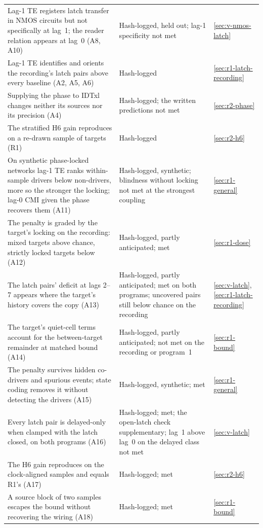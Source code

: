 {\begin{longtable}{@{}L{0.55\textwidth}L{0.28\textwidth}l@{}}
    Lag-1 TE registers latch transfer in NMOS circuits but not specifically at lag~1; the reader relation appears at lag~0 (A8, A10) & Hash-logged, held out; lag-1 specificity not met & \ref{sec:v-nmos-latch} \\
    Lag-1 TE identifies and orients the recording's latch pairs above every baseline (A2, A5, A6) & Hash-logged & \ref{sec:r1-latch-recording} \\
    Supplying the phase to IDTxl changes neither its sources nor its precision (A4) & Hash-logged; the written predictions not met & \ref{sec:r2-phase} \\
    The stratified H6 gain reproduces on a re-drawn sample of targets (R1) & Hash-logged & \ref{sec:r2-h6} \\
    On synthetic phase-locked networks lag-1 TE ranks within-sample drivers below non-drivers, more so the stronger the locking; lag-0 CMI given the phase recovers them (A11) & Hash-logged, synthetic; blindness without locking not met at the strongest coupling & \ref{sec:r1-general} \\
    The penalty is graded by the target's locking on the recording: mixed targets above chance, strictly locked targets below (A12) & Hash-logged, partly anticipated; met & \ref{sec:r1-dose} \\
    The latch pairs' deficit at lags 2--7 appears where the target's history covers the copy (A13) & Hash-logged, partly anticipated; met on both programs; uncovered pairs still below chance on the recording & \ref{sec:v-latch}, \ref{sec:r1-latch-recording} \\
    The target's quiet-cell terms account for the between-target remainder at matched bound (A14) & Hash-logged, partly anticipated; not met on the recording or program~1 & \ref{sec:r1-bound} \\
    The penalty survives hidden co-drivers and spurious events; state coding removes it without detecting the drivers (A15) & Hash-logged, synthetic; met & \ref{sec:r1-general} \\
    Every latch pair is delayed-only when clamped with the latch closed, on both programs (A16) & Hash-logged; met; the open-latch check supplementary; lag~1 above lag~0 on the delayed class not met & \ref{sec:v-latch} \\
    The H6 gain reproduces on the clock-aligned samples and equals R1's (A17) & Hash-logged; met & \ref{sec:r2-h6} \\
    A source block of two samples escapes the bound without recovering the wiring (A18) & Hash-logged; met & \ref{sec:r1-bound} \\

\end{longtable}}
